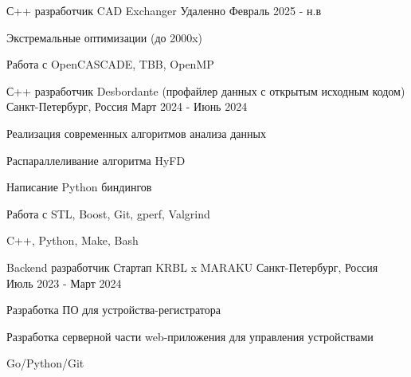 

\begin{cventries}

  \cventry
    {С++ разработчик} %
    {CAD Exchanger} %
    {Удаленно} %
    {Февраль 2025 - н.в} %
    {
      \begin{cvitems} %
        \item {Экстремальные оптимизации (до 2000x)}
        \item {Работа с OpenCASCADE, TBB, OpenMP}
      \end{cvitems}
    }

  \cventry
    {С++ разработчик} %
    {Desbordante (профайлер данных с открытым исходным кодом)} %
    {Санкт-Петербург, Россия} %
    {Март 2024 - Июнь 2024} %
    {
      \begin{cvitems} %
        \item {Реализация современных алгоритмов анализа данных}
        \item {Распараллеливание алгоритма HyFD}
        \item {Написание Python биндингов}
        \item {Работа с STL, Boost, Git, gperf, Valgrind}
        \item {C++, Python, Make, Bash}
      \end{cvitems}
    }

  \cventry
    {Backend разработчик} %
    {Стартап KRBL x MARAKU} %
    {Санкт-Петербург, Россия} %
    {Июль 2023 - Март 2024} %
    {
      \begin{cvitems} %
        \item {Разработка ПО для устройства-регистратора}
        \item {Разработка серверной части web-приложения для управления устройствами}
        \item {Go/Python/Git}
      \end{cvitems}
    }

\end{cventries}
